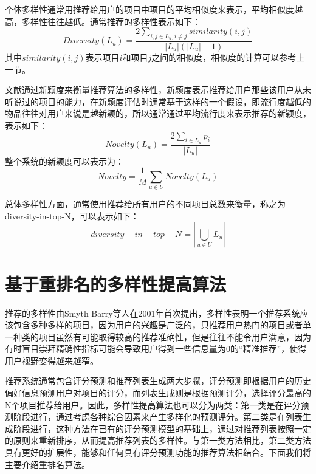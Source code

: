 \documentclass[master,winfonts]{njuthesis}
\begin{document}
个体多样性\cite{Jannach2010Recommender}通常用推荐给用户的项目中项目的平均相似度来表示，平均相似度越高，多样性往往越低。通常推荐的多样性表示如下：
\begin{equation}
Diversity(L_u) = \frac{2\sum_{i,j\in L_u,i\neq j}similarity(i,j)}{\left | L_u \right |(\left | L_u \right |-1)}
\end{equation}
其中$similarity(i,j)$表示项目$i$和项目$j$之间的相似度，相似度的计算可以参考上一节。

文献\cite{Weng2007Improving}通过新颖度来衡量推荐算法的多样性，新颖度表示推荐给用户那些该用户从未听说过的项目的能力，在新颖度评估时通常基于这样的一个假设，即流行度越低的物品往往对用户来说是越新颖的，所以通常通过平均流行度来表示推荐的新颖度，表示如下：
\begin{equation}
Novelty(L_u) = \frac{2\sum_{i\in L_u}p_i}{\left | L_u \right |}
\end{equation}
整个系统的新颖度可以表示为：
\begin{equation}
Novelty = \frac{1}{M}\sum_{u \in U}Novelty(L_u)
\end{equation}


总体多样性方面，通常使用推荐给所有用户的不同项目总数来衡量，称之为diversity-in-top-N，可以表示如下：
\begin{equation}
diversity-in-top-N=\left | \bigcup_{u \in U}L_u \right |
\end{equation}



\section{基于重排名的多样性提高算法}

推荐的多样性由Smyth Barry等人在2001年\cite{Smyth2001Similarity}首次提出，多样性表明一个推荐系统应该包含多种多样的项目，因为用户的兴趣是广泛的，只推荐用户热门的项目或者单一种类的项目虽然有可能取得较高的推荐准确性，但是往往不能令用户满意\cite{Zhou2010Solving}，因为有时盲目崇拜精确性指标可能会导致用户得到一些信息量为0的“精准推荐”，使得用户视野变得越来越窄\cite{Mcnee2006Being}。

推荐系统通常包含评分预测和推荐列表生成两大步骤，评分预测即根据用户的历史偏好信息预测用户对项目的评分，而列表生成则是根据预测评分，选择评分最高的N个项目推荐给用户。因此，多样性提高算法也可以分为两类：第一类是在评分预测阶段进行\cite{Park2008The,Singh2016Relative,Yin2012Challenging}，通过考虑各种综合因素来产生多样化的预测评分。第二类是在列表生成阶段进行\cite{Adomavicius2012Improving,article2011,汪千松2017一种基于参数化重排名提高多样性的推荐方法}，这种方法在已有的评分预测模型的基础上，通过对推荐列表按照一定的原则来重新排序，从而提高推荐列表的多样性。与第一类方法相比，第二类方法具有更好的扩展性，能够和任何具有评分预测功能的推荐算法相结合。下面我们将主要介绍重排名算法。
\end{document}
